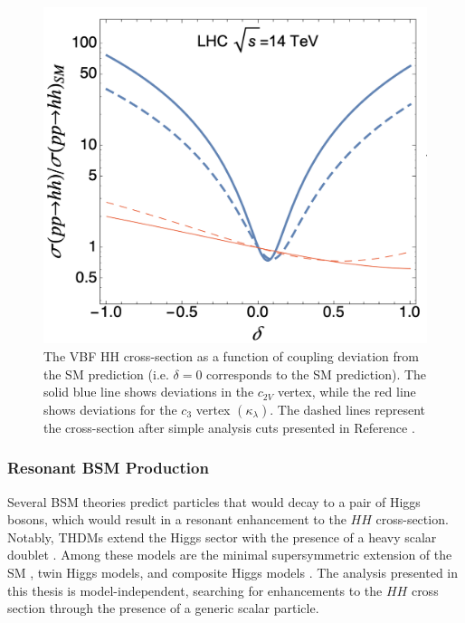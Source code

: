 \begin{figure}[!ht]
    \centering
    \includegraphics[width=.7\textwidth]{chapters/chapter1_theory/images/coupling_xsec.png}
    \caption[The VBF HH cross-section as a function of coupling deviation from the \gls{SM} prediction.]{The VBF HH cross-section as a function of coupling deviation from the \gls{SM} prediction (i.e. $\delta=0$ corresponds to the \gls{SM} prediction). The solid blue line shows deviations in the $c_{2V}$ vertex, while the red line shows deviations for the $c_{3}$ vertex $(\kappa_\lambda)$. The dashed lines represent the cross-section after simple analysis cuts presented in Reference \cite{vbfhh}.}
    \label{fig:c2v-xsec}
\end{figure}



\subsubsection{Resonant BSM Production}

Several \gls{BSM} theories predict particles that would decay to a pair of Higgs bosons, which would result in a resonant enhancement to the $HH$ cross-section. Notably, \glspl{THDM} extend the Higgs sector with the presence of a heavy scalar doublet \cite{THDM}. Among these models are the minimal supersymmetric extension of the \gls{SM} \cite{mssm}, twin Higgs models, and composite Higgs models \cite{compositeHiggs}. The analysis presented in this thesis is model-independent, searching for enhancements to the $HH$ cross section through the presence of a generic scalar particle.

